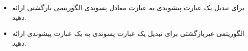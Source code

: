 \begin{itemize}
\item 
 برای تبدیل یک عبارت پیشوندی به عبارت معادل پسوندی الگوریتمی بازگشتی ارائه دهید.

\item 
الگوریتمی غیربازگشتی برای تبدیل یک عبارت پسوندی به یک عبارت پیشوندی ارائه دهید.

\end{itemize}
